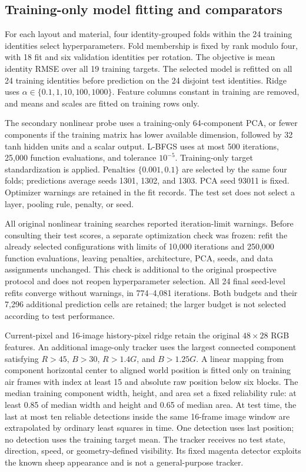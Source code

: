 \subsection{Training-only model fitting and comparators}
For each layout and material, four identity-grouped folds within the 24 training identities select hyperparameters. Fold membership is fixed by rank modulo four, with 18 fit and six validation identities per rotation. The objective is mean identity RMSE over all 19 training targets. The selected model is refitted on all 24 training identities before prediction on the 24 disjoint test identities. Ridge uses $\alpha\in\{0.1,1,10,100,1000\}$. Feature columns constant in training are removed, and means and scales are fitted on training rows only.

The secondary nonlinear probe uses a training-only 64-component PCA, or fewer components if the training matrix has lower available dimension, followed by 32 tanh hidden units and a scalar output. L-BFGS uses at most 500 iterations, 25,000 function evaluations, and tolerance $10^{-5}$. Training-only target standardization is applied. Penalties $\{0.001,0.1\}$ are selected by the same four folds; predictions average seeds 1301, 1302, and 1303. PCA seed 93011 is fixed. Optimizer warnings are retained in the fit records. The test set does not select a layer, pooling rule, penalty, or seed.

All original nonlinear training searches reported iteration-limit warnings. Before consulting their test scores, a separate optimization check was frozen: refit the already selected configurations with limits of 10,000 iterations and 250,000 function evaluations, leaving penalties, architecture, PCA, seeds, and data assignments unchanged. This check is additional to the original prospective protocol and does not reopen hyperparameter selection. All 24 final seed-level refits converge without warnings, in 774--4,081 iterations. Both budgets and their 7,296 additional prediction cells are retained; the larger budget is not selected according to test performance.

Current-pixel and 16-image history-pixel ridge retain the original $48\times28$ RGB features. An additional image-only tracker uses the largest connected component satisfying $R>45$, $B>30$, $R>1.4G$, and $B>1.25G$. A linear mapping from component horizontal center to aligned world position is fitted only on training air frames with index at least 15 and absolute raw position below six blocks. The median training component width, height, and area set a fixed reliability rule: at least 0.85 of median width and height and 0.65 of median area. At test time, the last at most ten reliable detections inside the same 16-frame image window are extrapolated by ordinary least squares in time. One detection uses last position; no detection uses the training target mean. The tracker receives no test state, direction, speed, or geometry-defined visibility. Its fixed magenta detector exploits the known sheep appearance and is not a general-purpose tracker.

